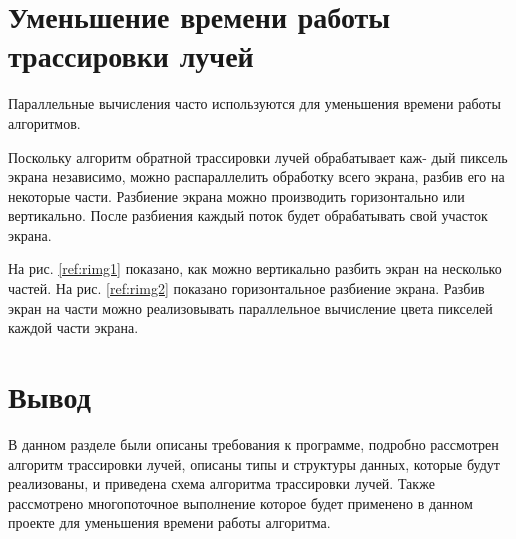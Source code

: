 \section {Уменьшение времени работы трассировки лучей}

Параллельные вычисления часто используются для уменьшения времени работы алгоритмов.

Поскольку алгоритм обратной трассировки лучей обрабатывает каж-
дый пиксель экрана независимо, можно распараллелить обработку всего
экрана, разбив его на некоторые части.
Разбиение экрана можно производить горизонтально или вертикально.
После разбиения каждый поток будет обрабатывать свой участок экрана.

На рис. \eqref{ref:rimg1} показано, как можно вертикально разбить экран на
несколько частей. На рис. \eqref{ref:rimg2} показано горизонтальное разбиение экрана.
Разбив экран на части можно реализовывать параллельное вычисление цвета
пикселей каждой части экрана.

\begin{figure}[ht!]
\end{figure}

\begin{figure}[ht!]
\end{figure}

\section{Вывод}

В данном разделе были описаны требования к программе, подробно рассмотрен алгоритм трассировки лучей,
описаны типы и структуры данных, которые будут реализованы,
и приведена схема алгоритма трассировки лучей.
Также рассмотрено многопоточное выполнение которое будет применено в данном проекте для уменьшения времени работы алгоритма.
